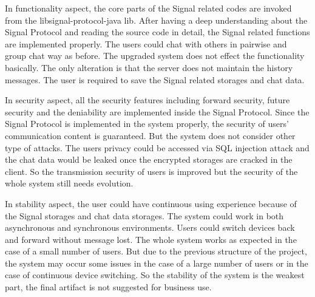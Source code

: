In functionality aspect, the core parts of the Signal related codes are invoked from the libsignal-protocol-java lib. After having a deep understanding about the Signal Protocol and reading the source code in detail, the Signal related functions are implemented properly. The users could chat with others in pairwise and group chat way as before. The upgraded system does not effect the functionality basically. The only alteration is that the server does not maintain the history messages. The user is required to save the Signal related storages and chat data.

In security aspect, all the security features including forward security, future security and the deniability are implemented inside the Signal Protocol. Since the Signal Protocol is implemented in the system properly, the security of users' communication content is guaranteed. But the system does not consider other type of attacks. The users privacy could be accessed via SQL injection attack and the chat data would be leaked once the encrypted storages are cracked in the client. So the transmission security of users is improved but the security of the whole system still needs evolution.

In stability aspect, the user could have continuous using experience because of the Signal storages and chat data storages. The system could work in both asynchronous and synchronous environments. Users could switch devices back and forward without message lost. The whole system works as expected in the case of a small number of users. But due to the previous structure of the project, the system may occur some issues in the case of a large number of users or in the case of continuous device switching. So the stability of the system is the weakest part, the final artifact is not suggested for business use. \nocite{GroupChat2} \nocite{Remain1} \nocite{Remain2} \nocite{Remain3} \nocite{Remain4} \nocite{Remain5}

\clearpage